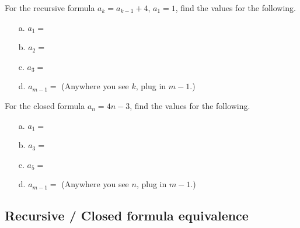         \begin{questionNOGRADE}{\thequestion}

            For the recursive formula $a_{k} = a_{k-1} + 4$, $a_{1} = 1$,
            find the values for the following.

            \begin{itemize}
                \item[a.] $a_{1} = $    
                \item[b.] $a_{2} = $    
                \item[c.] $a_{3} = $    
                \item[d.] $a_{m-1} = $  (Anywhere you see $k$, plug in $m-1$.)
            \end{itemize}
            
        \end{questionNOGRADE}

        \hrulefill

        \begin{questionNOGRADE}{\thequestion}

            For the closed formula $a_{n} = 4n - 3$,
            find the values for the following.

            \begin{itemize}
                \item[a.] $a_{1} = $    
                \item[b.] $a_{3} = $    
                \item[c.] $a_{5} = $    
                \item[d.] $a_{m-1} = $  (Anywhere you see $n$, plug in $m-1$.) \\
            \end{itemize}
            
        \end{questionNOGRADE}

    \newpage

    \subsection{Recursive / Closed formula equivalence}

